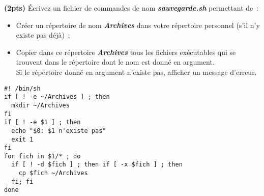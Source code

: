 \documentclass[10pt]{article}
\newcommand{\fich}[1]{{\bf \em #1}}
\begin{document}
\begin{Exercice}\textbf{(2pts)}
%
Écrivez un fichier de commandes de nom \fich{sauvegarde.sh} permettant de~: 
\begin{itemize}
\item 
	Créer un répertoire de nom \fich{Archives} dans votre répertoire 
	personnel (s'il n'y existe pas déjà)~;
      \item Copier dans ce répertoire \fich{Archives} tous les fichiers
        exécutables qui se trouvent dans le répertoire dont le nom est donné en
        argument.  \\
        Si le répertoire donné en argument n'existe pas, afficher un message
        d'erreur.
\end{itemize}
\end{Exercice}
\begin{Reponse}\newpage
  \begin{Verbatim}
#! /bin/sh
if [ ! -e ~/Archives ] ; then
  mkdir ~/Archives
fi
if [ ! -e $1 ] ; then
  echo "$0: $1 n'existe pas"
  exit 1
fi
for fich in $1/* ; do
  if [ ! -d $fich ] ; then if [ -x $fich ] ; then
    cp $fich ~/Archives
  fi; fi
done
  \end{Verbatim}
\end{Reponse}%
\end{document}
